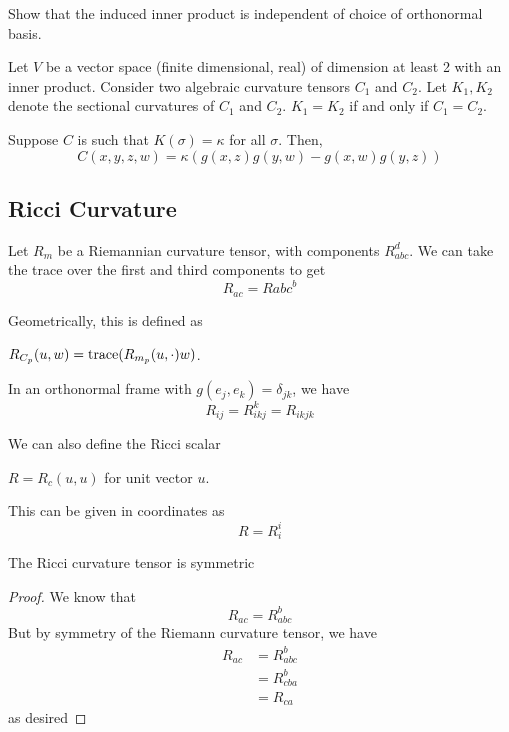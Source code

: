 \documentclass[../main.tex]{subfiles}
\begin{document}
\begin{hw}
    Show that the induced inner product is independent of choice of orthonormal
    basis.
\end{hw}

\begin{lemma}
    Let $V$ be a vector space (finite dimensional, real) of dimension at least
    2 with an inner product. Consider two algebraic curvature tensors $C_1$ and
    $C_2$. Let $K_1,K_2$ denote the sectional curvatures of $C_1$ and $C_2$.
    $K_1 = K_2$ if and only if $C_1 = C_2$.
\end{lemma}

Suppose $C$ is such that $K(\sigma)=\kappa$ for all $\sigma$. Then,
\begin{equation}
    C(x,y,z,w) = \kappa\left( g(x,z)g(y,w) -g(x,w)g(y,z) \right)
\end{equation}

\subsection*{Ricci Curvature}
Let $R_m$ be a Riemannian curvature tensor, with components $R_{abc}^d$.
We can take the trace over the first and third components to get
\begin{equation}
    R_{ac} = R{abc}^b
\end{equation}

Geometrically, this is defined as
\begin{defn}
    $R_{C_p}(u,w) = \textrm{trace}(R_{m_p}(u,\cdot)w)$.
\end{defn}

In an orthonormal frame with $g(e_j,e_k) = \delta_{jk}$, we have
\begin{equation}
    R_{ij} = R_{ikj}^k = R_{ikjk}
\end{equation}

We can also define the Ricci scalar
\begin{defn}
    $R = R_c(u,u)$ for unit vector $u$.
\end{defn}
This can be given in coordinates as
\begin{equation}
    R = R^i_i
\end{equation}

\begin{theorem}
    The Ricci curvature tensor is symmetric
\end{theorem}
\begin{proof}
    We know that
    \[
        R_{ac} = R_{abc}^b
    \]
    But by symmetry of the Riemann curvature tensor, we have
    \[
\begin{aligned}
    R_{ac} &= R_{abc}^b\\
            &= R_{cba}^b\\
            &= R_{ca}
\end{aligned}
    \]
    as desired
\end{proof}
\end{document}
